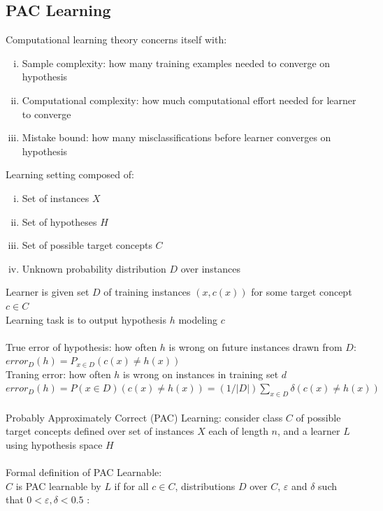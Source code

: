 \documentclass{article}
\begin{document}
		\subsection{PAC Learning}
			Computational learning theory concerns itself with: 
			\begin{enumerate}[(i)]
				\item Sample complexity: how many training examples needed to converge on hypothesis
				\item Computational complexity: how much computational effort needed for learner to converge
				\item Mistake bound: how many misclassifications before learner converges on hypothesis
				\end{enumerate}
			Learning setting composed of:
			\begin{enumerate}[(i)]
				\item Set of instances $X$
				\item Set of hypotheses $H$
				\item Set of possible target concepts $C$
				\item Unknown probability distribution $D$ over instances
				\end{enumerate}
			Learner is given set $D$ of training instances $(x, c(x))$ for some target concept $c \in C$ \\
			Learning task is to output hypothesis $h$ modeling $c$ \\
			\\
			True error of hypothesis: how often $h$ is wrong on future instances drawn from $D$: \\
			$error_D(h) = P_{x \in D}(c(x) \neq h(x))$ \\
			Traning error: how often $h$ is wrong on instances in training set $d$ \\
			$error_D(h) = P(x \in D)(c(x) \neq h(x)) = (1/|D|)\sum_{x \in D}\delta(c(x) \neq h(x))$ \\
			\\
			Probably Approximately Correct (PAC) Learning: consider class $C$ of possible target concepts defined over set of instances $X$ each of length $n$, and a learner $L$ using hypothesis space $H$ \\
			\\
			Formal definition of PAC Learnable: \\
			$C$ is PAC learnable by $L$ if for all $c \in C$, distributions $D$ over $C$, $\varepsilon$ and $\delta$ such that $0 < \varepsilon, \delta < 0.5$ : \\
\end{document}
